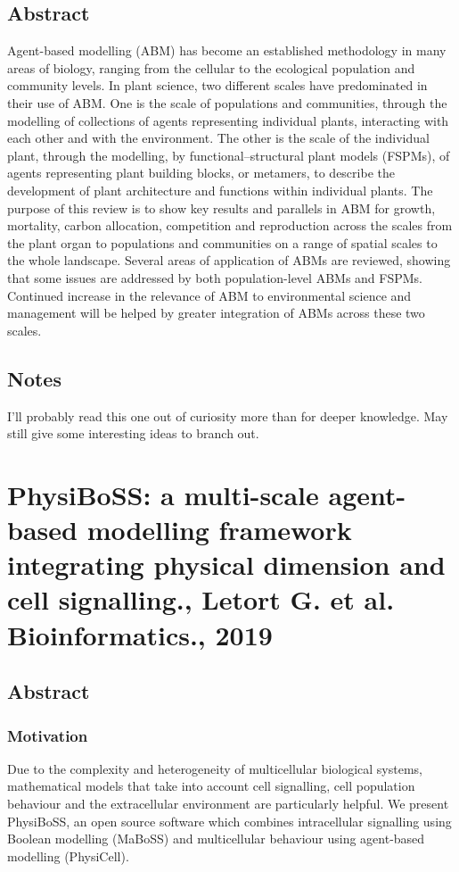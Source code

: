 \documentclass[11pt,a4paper]{article}
\begin{document}
\subsection*{Abstract}
Agent-based modelling (ABM) has become an established methodology in many areas of biology, ranging from the cellular to the ecological population and community levels. In plant science, two different scales have predominated in their use of ABM. One is the scale of populations and communities, through the modelling of collections of agents representing individual plants, interacting with each other and with the environment. The other is the scale of the individual plant, through the modelling, by functional–structural plant models (FSPMs), of agents representing plant building blocks, or metamers, to describe the development of plant architecture and functions within individual plants. The purpose of this review is to show key results and parallels in ABM for growth, mortality, carbon allocation, competition and reproduction across the scales from the plant organ to populations and communities on a range of spatial scales to the whole landscape. Several areas of application of ABMs are reviewed, showing that some issues are addressed by both population-level ABMs and FSPMs. Continued increase in the relevance of ABM to environmental science and management will be helped by greater integration of ABMs across these two scales.

\subsection*{Notes}
I'll probably read this one out of curiosity more than for deeper knowledge. May still give some interesting ideas to branch out.

\section*{PhysiBoSS: a multi-scale agent-based modelling framework integrating physical dimension and cell signalling., Letort G. et al. Bioinformatics., 2019}
\subsection*{Abstract}
\subsubsection*{Motivation}
Due to the complexity and heterogeneity of multicellular biological systems, mathematical models that take into account cell signalling, cell population behaviour and the extracellular environment are particularly helpful. We present PhysiBoSS, an open source software which combines intracellular signalling using Boolean modelling (MaBoSS) and multicellular behaviour using agent-based modelling (PhysiCell).
\end{document}
